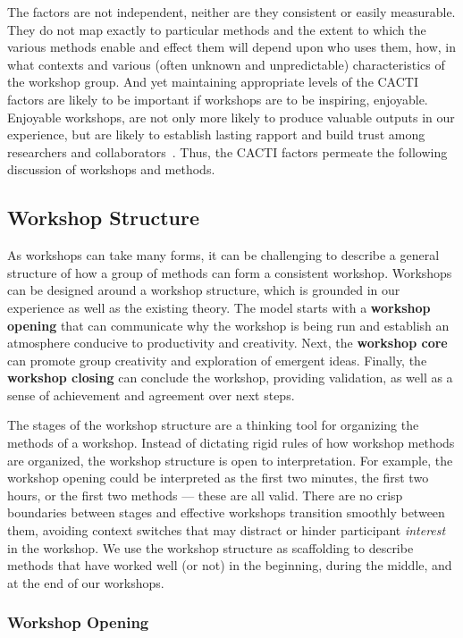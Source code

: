 The factors are not independent, neither are they consistent or easily measurable. They do not map exactly to particular methods and the extent to which the various methods enable and effect them will depend upon who uses them, how, in what contexts and various (often unknown and unpredictable) characteristics of the workshop group. And yet maintaining appropriate levels of the CACTI factors are likely to be important if workshops are to be inspiring, enjoyable. Enjoyable workshops, are not only more likely to produce valuable outputs in our experience, but are likely to establish lasting rapport and build trust among researchers and collaborators~\cite{Sawyer2003}. Thus, the CACTI factors permeate the following discussion of workshops and methods. 

\subsection{Workshop Structure}

As workshops can take many forms, it can be challenging to describe a general structure of how a group of methods can form a consistent workshop. Workshops can be designed around a workshop structure, which is grounded in our experience as well as the existing theory. The model starts with a {\bf workshop opening} that can communicate why the workshop is being run and establish an atmosphere conducive to productivity and creativity. Next, the {\bf workshop core} can promote group creativity and exploration of emergent ideas. Finally, the {\bf workshop closing} can conclude the workshop, providing validation, as well as a sense of achievement and agreement over next steps.

The stages of the workshop structure are a thinking tool for organizing the methods of a workshop. Instead of dictating rigid rules of how workshop methods are organized, the workshop structure is open to interpretation. For example, the workshop opening could be interpreted as the first two minutes, the first two hours, or the first two methods --- these are all valid. There are no crisp boundaries between stages and effective workshops transition smoothly between them, avoiding context switches that may distract or hinder participant {\it interest} in the workshop. We use the workshop structure as scaffolding to describe methods that have worked well (or not) in the beginning, during the middle, and at the end of our workshops. 

\subsubsection{Workshop Opening}

